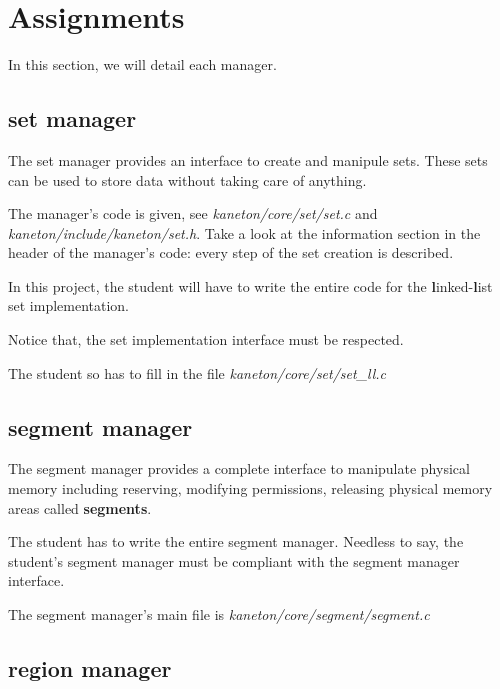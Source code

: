 %
%

\section{Assignments}

In this section, we will detail each manager.

%
%

\subsection{set manager}

The set manager provides an interface to create and manipule sets. These
sets can be used to store data without taking care of anything.

The manager's code is given, see \textit{kaneton/core/set/set.c} and
\textit{kaneton/include/kaneton/set.h}. Take a look at the information
section in the header of the manager's code: every step of the set creation
is described.

In this project, the student will have to write the entire code for
the \textbf{l}inked-\textbf{l}ist set implementation.

Notice that, the set implementation interface must be respected.

The student so has to fill in the file \textit{kaneton/core/set/set\_ll.c}

%
%

\subsection{segment manager}

The segment manager provides a complete interface to manipulate physical
memory including reserving, modifying permissions, releasing physical
memory areas called \textbf{segments}.

The student has to write the entire segment manager. Needless to say, the
student's segment manager must be compliant with the segment manager
interface.

The segment manager's main file is \textit{kaneton/core/segment/segment.c}

%
%

\subsection{region manager}

